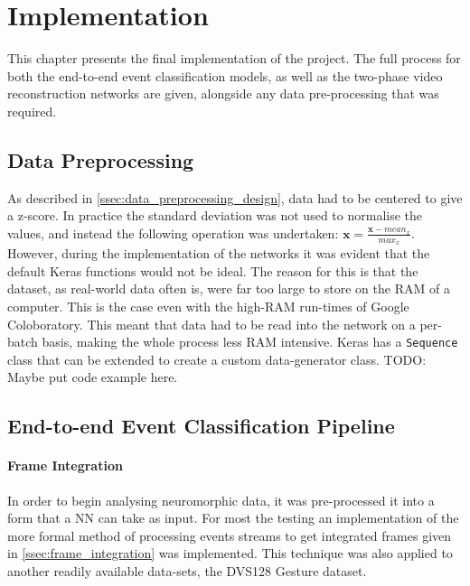 \chapter{Implementation} \label{chap:implementation}

This chapter presents the final implementation of the project. The full process for both the end-to-end event classification models, as well as the two-phase video reconstruction networks are given, alongside any data pre-processing that was required.

\section{Data Preprocessing}

As described in  \cref{ssec:data_preprocessing_design}, data had to be centered to give a z-score. In practice the standard deviation was not used to normalise the values, and instead the following operation was undertaken: $ \textbf{x} = \frac{\textbf{x} - mean_x}{max_x} $. However, during the implementation of the networks it was evident that the default Keras functions would not be ideal. The reason for this is that the dataset, as real-world data often is, were far too large to store on the RAM of a computer. This is the case even with the high-RAM run-times of Google Coloboratory. This meant that data had to be read into the network on a per-batch basis, making the whole process less RAM intensive. Keras has a \lstinline{Sequence} class that can be extended to create a custom data-generator class. \color{red} TODO: Maybe put code example here. \color{black}

\section{End-to-end Event Classification Pipeline}

\subsubsection{Frame Integration}

In order to begin analysing neuromorphic data, it was pre-processed it into a form that a NN can take as input. For most the testing an implementation of the more formal method of processing events streams to get integrated frames given in \cref{ssec:frame_integration} was implemented. This technique was also applied to another readily available data-sets, the DVS128 Gesture dataset.

